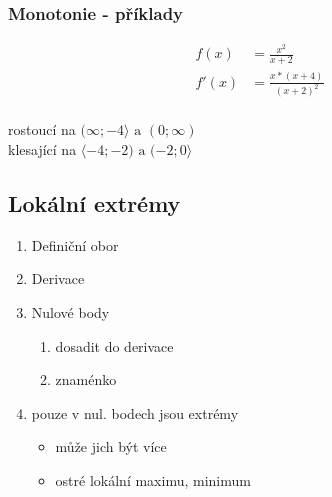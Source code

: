 \subsubsection{Monotonie - příklady}
\begin{align*}
  f(x)&=\frac{x^2}{x+2} \\
  f'(x)&=\frac{x*(x+4)}{(x+2)^2} \\
\end{align*}
\begin{center}
rostoucí na $(\infty;-4\rangle \text{ a } (0;\infty)$ \\
klesající na $\langle-4;-2) \text{ a } (-2;0\rangle$
\end{center}

\subsection{Lokální extrémy}
\begin{enumerate}
  \item Definiční obor
  \item Derivace
  \item Nulové body
    \begin{enumerate}[label=(\alph*)]
      \item dosadit do derivace
      \item znaménko
    \end{enumerate}
  \item pouze v nul. bodech jsou extrémy
    \begin{itemize}
      \item může jich být více
      \item ostré lokální maximu, minimum
    \end{itemize}
\end{enumerate}
